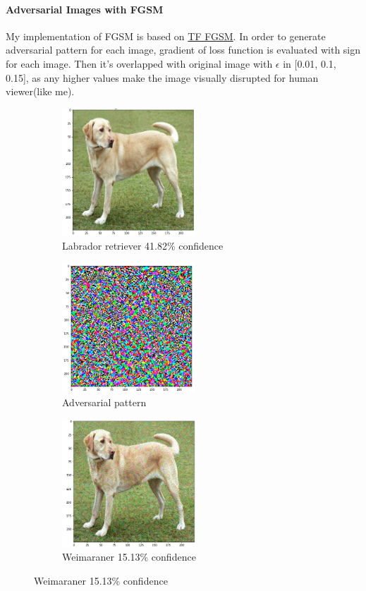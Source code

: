 \paragraph{Adversarial Images with FGSM}
My implementation of FGSM is based on \href{https://www.tensorflow.org/tutorials/generative/adversarial_fgsm}{TF FGSM}.
In order to generate adversarial pattern for each image, gradient of loss function is evaluated with sign for each image.
Then it's overlapped with original image with $\epsilon$ in [0.01, 0.1, 0.15], as any higher values make the image visually disrupted
for human viewer(like me).
\\
\begin{figure}[!h]
    \begin{subfigure}{0.33\textwidth}
        \caption{Labrador retriever 41.82\% confidence}
        \includegraphics[width=5cm]{images/labrador}
    \end{subfigure}
    \begin{subfigure}{0.33\textwidth}
        \caption{Adversarial pattern}
        \includegraphics[width=5cm]{images/adv_pattern}
    \end{subfigure}
    \begin{subfigure}{0.3\textwidth}
        \caption{Weimaraner 15.13\% confidence}
        \includegraphics[width=5cm]{images/adv_labrador}
    \end{subfigure}
\end{figure}

